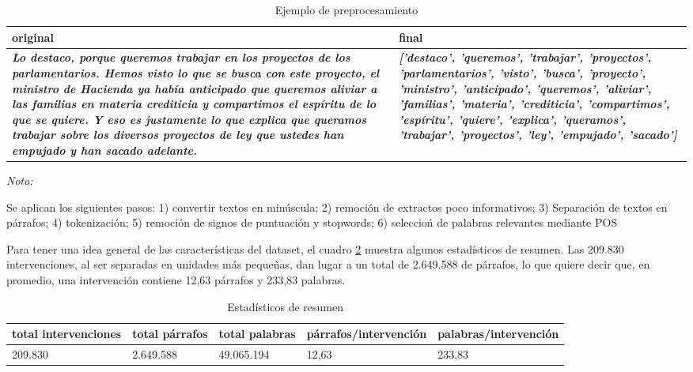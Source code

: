 \documentclass[
  12pt,
]{article}
\begin{document}
\begin{table}[H]

\caption{\label{tab:ejemplo_preprocesamiento}Ejemplo de preprocesamiento}
\centering
\begin{threeparttable}
\begin{tabular}[t]{>{\raggedright\arraybackslash}p{15em}>{\raggedright\arraybackslash}p{15em}}
\toprule
original & final\\
\midrule
\em{\textbf{Lo destaco, porque queremos trabajar en los proyectos de los parlamentarios. Hemos visto lo que se busca con este proyecto, el ministro de Hacienda ya había anticipado que queremos aliviar  a las familias en materia crediticia y compartimos el espíritu de lo que se quiere. Y eso es justamente lo que explica  que queramos trabajar sobre los diversos proyectos de ley que ustedes han empujado y han sacado adelante.}} & \em{\textbf{{}['destaco', 'queremos', 'trabajar', 'proyectos', 'parlamentarios', 'visto', 'busca', 'proyecto', 'ministro',  'anticipado', 'queremos', 'aliviar', 'familias', 'materia', 'crediticia', 'compartimos', 'espíritu',  'quiere', 'explica', 'queramos', 'trabajar', 'proyectos', 'ley', 'empujado', 'sacado']}}\\
\bottomrule
\end{tabular}
\begin{tablenotes}[para]
\small
\item \textit{Nota:} 
\item Se aplican los siguientes pasos: 1) convertir textos en minúscula; 2) remoción de extractos poco informativos; 3) Separación de textos en párrafos; 4) tokenización; 5) remoción de signos de puntuación y stopwords; 6) seleccioń de palabras relevantes mediante POS
\end{tablenotes}
\end{threeparttable}
\end{table}

Para tener una idea general de las características del dataset, el
cuadro \ref{tab:descripcion_dataset} muestra algunos estadísticos de
resumen. Las 209.830 intervenciones, al ser separadas en unidades más
pequeñas, dan lugar a un total de 2.649.588 de párrafos, lo que quiere
decir que, en promedio, una intervención contiene 12,63 párrafos y
233,83 palabras.

\begin{table}[H]

\caption{\label{tab:descripcion_dataset}Estadísticos de resumen}
\centering
\begin{tabular}[t]{lllll}
\toprule
total intervenciones & total párrafos & total palabras & párrafos/intervención & palabras/intervención\\
\midrule
209.830 & 2.649.588 & 49.065.194 & 12,63 & 233,83\\
\bottomrule
\end{tabular}
\end{table}
\end{document}
